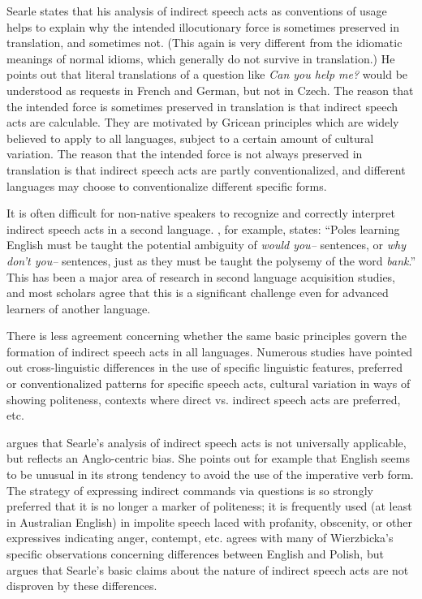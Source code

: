 Searle states that his analysis of indirect speech acts as conventions of usage helps to explain why the intended illocutionary force is sometimes preserved in translation, and sometimes not. (This again is very different from the idiomatic meanings of normal idioms, which generally do not survive in translation.) He points out that literal translations of a question like \textit{Can you help me?} would be understood as requests in French and German, but not in Czech. The reason that the intended force is sometimes preserved in translation is that indirect speech acts are calculable. They are motivated by Gricean principles which are widely believed to apply to all languages, subject to a certain amount of cultural variation. The reason that the intended force is not always preserved in translation is that indirect speech acts are partly conventionalized, and different languages may choose to conventionalize different specific forms.



It is often difficult for non-native speakers to recognize and correctly interpret indirect speech acts in a second language. \citet[175]{Wierzbicka1985}, for example, states: “Poles learning English must be taught the potential ambiguity of \textit{would you–} sentences, or \textit{why don’t you–} sentences, just as they must be taught the polysemy of the word \textit{bank}.” This has been a major area of research in second language acquisition studies, and most scholars agree that this is a significant challenge even for advanced learners of another language.



There is less agreement concerning whether the same basic principles govern the formation of indirect speech acts in all languages. Numerous studies have pointed out cross-linguistic differences in the use of specific linguistic features, preferred or conventionalized patterns for specific speech acts, cultural variation in ways of showing politeness, contexts where direct vs. indirect speech acts are preferred, etc.



\citet{Wierzbicka1985} argues that Searle’s analysis of indirect speech acts is not universally applicable, but reflects an Anglo-centric bias. She points out for example that English seems to be unusual in its strong tendency to avoid the use of the imperative verb form. The strategy of expressing indirect commands via questions is so strongly preferred that it is no longer a marker of politeness; it is frequently used (at least in Australian English) in impolite speech laced with profanity, obscenity, or other expressives indicating anger, contempt, etc. \citet{Kalisz1992} agrees with many of Wierzbicka’s specific observations concerning differences between English and Polish, but argues that Searle’s basic claims about the nature of indirect speech acts are not disproven by these differences.



